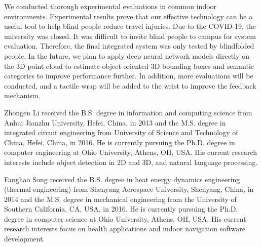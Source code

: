 \documentclass{ieeeaccess}
\begin{document}
 
We conducted thorough experimental evaluations in common indoor environments. Experimental results prove that our effective technology can be a useful tool to help blind people reduce travel injuries. Due to the COVID-19, the university was closed. It was difficult to invite blind people to campus for system evaluation. Therefore, the final integrated system was only tested by blindfolded people. In the future, we plan to apply deep neural network models directly on the 3D point cloud to estimate object-oriented 3D bounding boxes and semantic categories to improve performance further. In addition, more evaluations will be conducted, and a tactile wrap will be added to the wrist to improve the feedback mechanism.

%
%



\newpage

\begin{IEEEbiography}{Zhongen Li} received the B.S. degree in information and computing science from Anhui Jianzhu University, Hefei, China, in 2013 and the M.S. degree in integrated circuit engineering from University of Science and Technology of China, Hefei, China, in 2016. He is currently pursuing the Ph.D. degree in computer engineering at Ohio University, Athens, OH, USA. His current research interests include object detection in 2D and 3D, and natural language processing.
\end{IEEEbiography}

\begin{IEEEbiography}{Fanghao Song} 
received the B.S. degree in heat energy dynamics engineering (thermal engineering) from Shenyang Aerospace University, Shenyang, China, in 2014 and the M.S. degree in mechanical engineering from the University of Southern California, CA, USA, in 2016. He is currently pursuing the Ph.D. degree in computer science at Ohio University, Athens, OH, USA. His current research interests focus on health applications and indoor navigation software development. 
\end{IEEEbiography}
\end{document}
